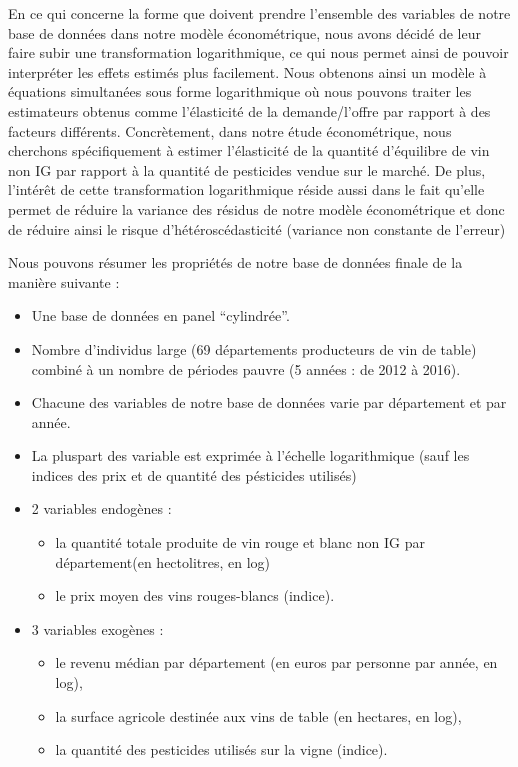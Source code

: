 \documentclass[11pt,]{article}
\providecommand{\tightlist}{%
  \setlength{\itemsep}{0pt}\setlength{\parskip}{0pt}}
\begin{document}
En ce qui concerne la forme que doivent prendre l'ensemble des variables
de notre base de données dans notre modèle économétrique, nous avons
décidé de leur faire subir une transformation logarithmique, ce qui nous
permet ainsi de pouvoir interpréter les effets estimés plus facilement.
Nous obtenons ainsi un modèle à équations simultanées sous forme
logarithmique où nous pouvons traiter les estimateurs obtenus comme
l'élasticité de la demande/l'offre par rapport à des facteurs
différents. Concrètement, dans notre étude économétrique, nous cherchons
spécifiquement à estimer l'élasticité de la quantité d'équilibre de vin
non IG par rapport à la quantité de pesticides vendue sur le marché. De
plus, l'intérêt de cette transformation logarithmique réside aussi dans
le fait qu'elle permet de réduire la variance des résidus de notre
modèle économétrique et donc de réduire ainsi le risque
d'hétéroscédasticité (variance non constante de l'erreur)

Nous pouvons résumer les propriétés de notre base de données finale de
la manière suivante :

\begin{itemize}
\item
  Une base de données en panel ``cylindrée''.
\item
  Nombre d'individus large (69 départements producteurs de vin de table)
  combiné à un nombre de périodes pauvre (5 années : de 2012 à 2016).
\item
  Chacune des variables de notre base de données varie par département
  et par année.
\item
  La pluspart des variable est exprimée à l'échelle logarithmique (sauf
  les indices des prix et de quantité des pésticides utilisés)
\item
  2 variables endogènes :

  \begin{itemize}
  \tightlist
  \item
    la quantité totale produite de vin rouge et blanc non IG par
    département(en hectolitres, en log)
  \item
    le prix moyen des vins rouges-blancs (indice).
  \end{itemize}
\item
  3 variables exogènes :

  \begin{itemize}
  \tightlist
  \item
    le revenu médian par département (en euros par personne par année,
    en log),
  \item
    la surface agricole destinée aux vins de table (en hectares, en
    log),
  \item
    la quantité des pesticides utilisés sur la vigne (indice).
  \end{itemize}
\end{itemize}
\end{document}
